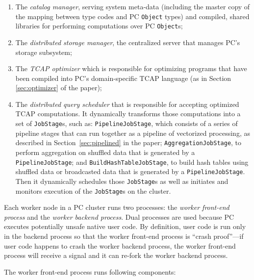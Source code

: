 \begin{enumerate}
\item The \emph{catalog manager}, serving system meta-data (including the master copy of
the mapping between type codes and PC \texttt{Object} types) and compiled, shared libraries
for performing computations over PC \texttt{Object}s;
\item The \emph{distributed storage manager}, 
the centralized server that manages PC's storage subsystem; 
\item The \emph{TCAP optimizer} which is responsible for optimizing
  programs that have been compiled into PC's domain-specific TCAP
  language (as in 
Section \ref{sec:optimizer} of the paper);
\item The \emph{distributed query scheduler} that is responsible for accepting optimized TCAP computations.
It dynamically transforms those computations into a set of \texttt{JobStage}s,
such as:
\texttt{PipelineJobStage}, which consists of a series of pipeline
stages that can run together as a pipeline of vectorized processing, as
described in Section~\ref{sec:pipelined} in the paper;
\texttt{AggregationJobStage}, to perform aggregation on shuffled data that is
generated by a \texttt{PipelineJobStage}; and \texttt{BuildHashTableJobStage}, to build hash
tables using shuffled data or broadcasted data that is generated by a
\texttt{PipelineJobStage}. Then it
dynamically schedules those \texttt{JobStage}s as well as initiates and
monitors execution of the \texttt{JobStage}s on the cluster.
\end{enumerate}

\noindent 
Each worker node in a PC cluster runs two processes: the \emph{worker front-end process} and the \emph{worker backend process}.
Dual processes are used because PC executes potentially unsafe native user code.  By definition, user code is run only in the backend process so that the
worker front-end process is ``crash proof''---if            
user code happens to crash the worker backend process, the worker front-end process will receive a signal and it can re-fork the worker
backend process.

The worker front-end process runs following components:

